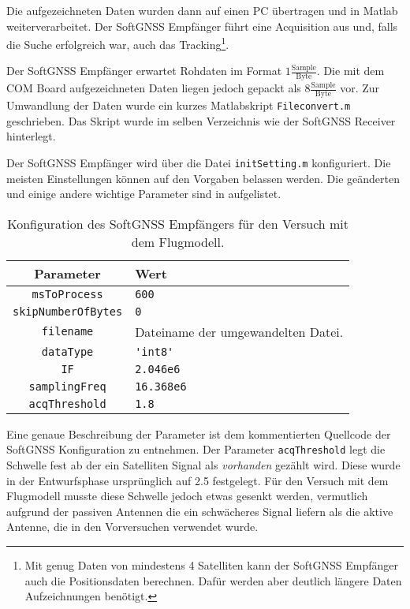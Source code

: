 Die aufgezeichneten Daten wurden dann auf einen PC übertragen und in Matlab weiterverarbeitet. Der SoftGNSS Empfänger führt eine Acquisition aus und, falls die Suche erfolgreich war, auch das Tracking\footnote{Mit genug Daten von mindestens 4 Satelliten kann der SoftGNSS Empfänger auch die Positionsdaten berechnen. Dafür werden aber deutlich längere Daten Aufzeichnungen benötigt.}.

Der SoftGNSS Empfänger erwartet Rohdaten im Format $1\frac{\textrm{Sample}}{\textrm{Byte}}$. Die mit dem COM Board aufgezeichneten Daten liegen jedoch gepackt als $8\frac{\textrm{Sample}}{\textrm{Byte}}$ vor. Zur Umwandlung der Daten wurde ein kurzes Matlabskript \lstinline$Fileconvert.m$ geschrieben. Das Skript wurde im selben Verzeichnis wie der SoftGNSS Receiver hinterlegt.

Der SoftGNSS Empfänger wird über die Datei \lstinline$initSetting.m$ konfiguriert. Die meisten Einstellungen können auf den Vorgaben belassen werden. Die geänderten und einige andere wichtige Parameter sind in  aufgelistet.

\begin{table}[htbp]
    \ttabbox
    {
        \caption[Konfiguration des SoftGNSS Empfängers]{Konfiguration des SoftGNSS Empfängers für den Versuch mit dem \dscubesat Flugmodell.}
        \label{SoftGNSSConfig}
    }
    {
    \begin{tabular}{c p{6cm}}
        \toprule
        Parameter               & Wert \\
        \midrule
        \lstinline$msToProcess$         & \lstinline{600} \\
        \lstinline$skipNumberOfBytes$   & \lstinline{0} \\
        \lstinline$filename$            & Dateiname der umgewandelten Datei. \\
        \lstinline$dataType$            & \lstinline$'int8'$ \\
        \lstinline$IF$                  & \lstinline$2.046e6$ \\
        \lstinline$samplingFreq$        & \lstinline$16.368e6$ \\
        \lstinline$acqThreshold$        & \lstinline$1.8$ \\
        \bottomrule
    \end{tabular}
}
\end{table}

Eine genaue Beschreibung der Parameter ist dem kommentierten Quellcode der SoftGNSS Konfiguration zu entnehmen. Der Parameter \lstinline$acqThreshold$ legt die Schwelle fest ab der ein Satelliten Signal als \emph{vorhanden} gezählt wird. Diese wurde in der Entwurfsphase ursprünglich auf \num{2.5} festgelegt. Für den Versuch mit dem Flugmodell musste diese Schwelle jedoch etwas gesenkt werden, vermutlich aufgrund der passiven Antennen die ein schwächeres Signal liefern als die aktive Antenne, die in den Vorversuchen verwendet wurde.

